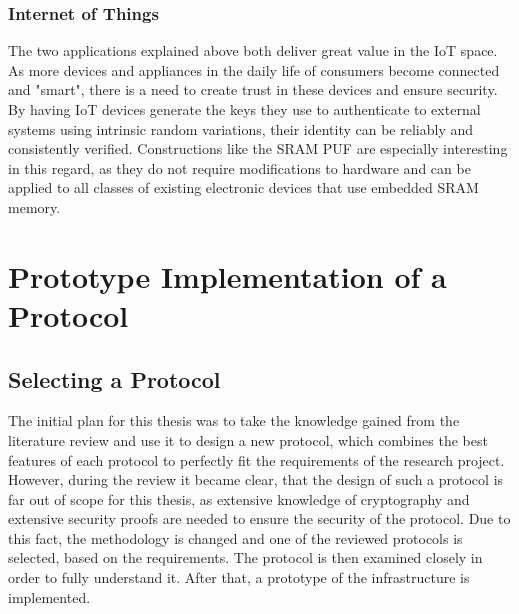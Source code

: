 \subsubsection{Internet of Things}

The two applications explained above both deliver great value in the \ac{IoT} space.
As more devices and appliances in the daily life of consumers become connected and "smart",
there is a need to create trust in these devices and ensure security.
By having IoT devices generate the keys they use to authenticate to external systems using
intrinsic random variations, their identity can be reliably and consistently verified.
Constructions like the \ac{SRAM} PUF are especially interesting in this regard, as they do not require modifications
to hardware and can be applied to all classes of existing electronic devices that use embedded SRAM
memory. \cite[][p. 88]{Gao2020}
\newpage
\section{Prototype Implementation of a Protocol}
\label{sec:implementation}

\subsection{Selecting a Protocol}
\label{sec:imp_selection}

The initial plan for this thesis was to take the knowledge gained from the literature review
and use it to design a new protocol, which combines the best features of each
protocol to perfectly fit the requirements of the research project.
However, during the review it became clear, that the design of such a protocol is far
out of scope for this thesis, as extensive knowledge of cryptography and extensive
security proofs are needed to ensure the security of the protocol.
Due to this fact, the methodology is changed and one of the reviewed protocols is selected,
based on the requirements.
The protocol is then examined closely in order to fully understand it.
After that, a prototype of the infrastructure is implemented.

